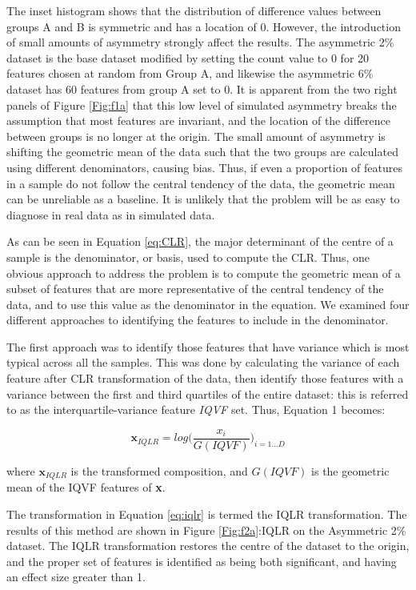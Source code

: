\documentclass{bmcart}
\begin{document}
The inset histogram shows that the distribution of difference values between groups A and B is symmetric and has a location of 0. However, the introduction of small amounts of asymmetry strongly affect the results. The asymmetric 2\% dataset is the base dataset modified by setting the count value to 0 for 20 features chosen at random from Group A, and likewise the asymmetric 6\% dataset has 60 features from group A set to 0. It is apparent from the two right panels of Figure \ref{Fig:f1a} that this low level of simulated asymmetry breaks the assumption that most features are invariant, and the location of the difference between groups is no longer at the origin.  The small amount of asymmetry is shifting the geometric mean of the data such that the two groups are calculated using different denominators, causing bias. Thus, if even a proportion of features in a sample  do not follow the central tendency of the data, the geometric mean can be unreliable as a baseline. It is unlikely that the problem will be as easy to diagnose in real data as in simulated data. 

As can be seen in Equation \ref{eq:CLR}, the major determinant of the centre of a sample is the denominator, or basis, used to compute the CLR. Thus, one obvious approach to address the problem is to compute the geometric mean of a subset of features that are more representative of the central tendency of the data, and to use this value as the denominator in the equation. We  examined four different approaches to identifying the features to include in the denominator. 

The first approach was to identify those features that have variance which is most typical across all the samples. This was  done by calculating the variance of each feature after CLR transformation of the data, then identify  those features with a variance between the first and third quartiles of the entire dataset: this is referred to as the interquartile-variance feature \textit{IQVF} set. Thus, Equation 1 becomes:

\begin{equation}
\textbf{x}_{\mathit{IQLR}} = log  \big( \frac{x_i}{G(\mathit{IQVF})}   \big)_{i=1 \dots D}
\label{eq:iqlr}
\end{equation}

where $\textbf{x}_{IQLR}$ is the transformed composition, and 	$G(IQVF)$ is the geometric mean of the IQVF features of \textbf{x}. 
 
 
The transformation in Equation \ref{eq:iqlr} is termed the IQLR transformation. The results of this method are shown in Figure \ref{Fig:f2a}:IQLR on the Asymmetric 2\% dataset. The IQLR transformation restores the centre of the dataset to the origin, and the proper set of features is identified as being both significant, and having an effect size greater than 1.
\end{document}
